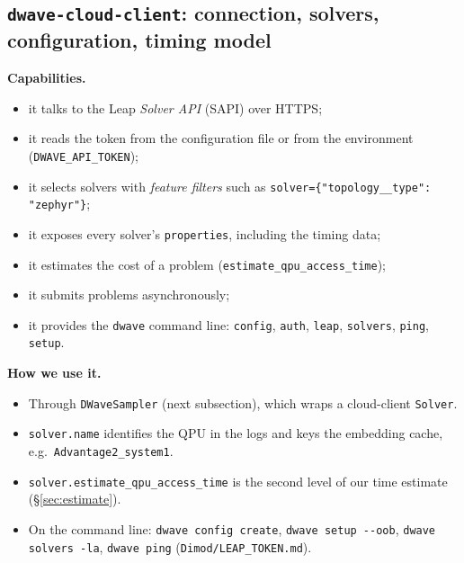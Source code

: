 \documentclass[11pt,a4paper]{article}
\newcommand{\code}[1]{\nolinkurl{#1}}
\begin{document}
\subsection{\texorpdfstring{\code{dwave-cloud-client}}{dwave-cloud-client}: connection, solvers, configuration, timing model}
\textbf{Capabilities.}
\begin{itemize}
\item it talks to the Leap \emph{Solver API} (SAPI) over HTTPS;
\item it reads the token from the configuration file or from the environment (\code{DWAVE_API_TOKEN});
\item it selects solvers with \emph{feature filters} such as \code{solver={"topology__type": "zephyr"}};
\item it exposes every solver's \code{properties}, including the timing data;
\item it estimates the cost of a problem (\code{estimate_qpu_access_time});
\item it submits problems asynchronously;
\item it provides the \code{dwave} command line: \code{config}, \code{auth}, \code{leap}, \code{solvers}, \code{ping}, \code{setup}.
\end{itemize}

\textbf{How we use it.}
\begin{itemize}
\item Through \code{DWaveSampler} (next subsection), which wraps a cloud-client \code{Solver}.
\item \code{solver.name} identifies the QPU in the logs and keys the embedding cache, e.g.\ \code{Advantage2_system1}.
\item \code{solver.estimate_qpu_access_time} is the second level of our time estimate (\S\ref{sec:estimate}).
\item On the command line: \code{dwave config create}, \code{dwave setup --oob}, \code{dwave solvers -la}, \code{dwave ping} (\code{Dimod/LEAP_TOKEN.md}).
\end{itemize}
\end{document}
